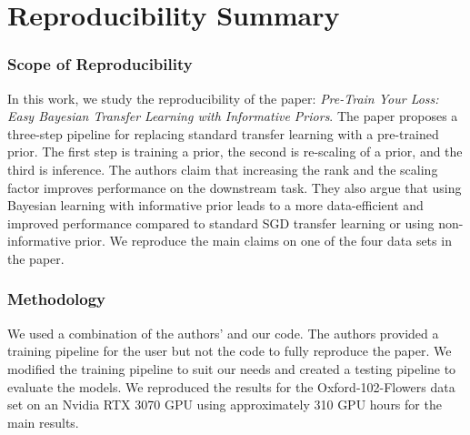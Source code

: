 \section*{\centering Reproducibility Summary}


\subsubsection*{Scope of Reproducibility}

In this work, we study the reproducibility of the paper: \textit{Pre-Train Your Loss: Easy Bayesian Transfer Learning with Informative Priors}. The paper proposes a three-step pipeline for replacing standard transfer learning with a pre-trained prior. The first step is training a prior, the second is re-scaling of a prior, and the third is inference.
The authors claim that increasing the rank and the scaling factor improves performance on the downstream task. They also argue that using Bayesian learning with informative prior leads to a more data-efficient and improved performance compared to standard SGD transfer learning or using non-informative prior. We reproduce the main claims on one of the four data sets in the paper.

\subsubsection*{Methodology}

We used a combination of the authors' and our code. The authors provided a training pipeline for the user but not the code to fully reproduce the paper. We modified the training pipeline to suit our needs and created a testing pipeline to evaluate the models. We reproduced the results for the Oxford-102-Flowers data set on an Nvidia RTX 3070 GPU using approximately 310 GPU hours for the main results.

